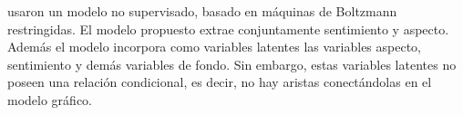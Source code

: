 \citeauthor{Wang2015} \cite{Wang2015} usaron un modelo no supervisado, basado en
máquinas de Boltzmann restringidas. El modelo propuesto extrae conjuntamente
sentimiento y aspecto. Además el modelo incorpora como variables latentes las
variables aspecto, sentimiento y demás variables de fondo. Sin embargo, estas
variables latentes no poseen una relación condicional, es decir, no hay aristas
conectándolas en el modelo gráfico.

